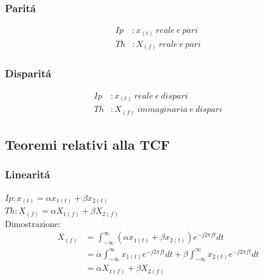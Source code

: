         \subsubsection{Paritá}\label{Parita}
            \begin{align}
                Ip&: x_{(t)}\ reale\ e\ pari  \nonumber \\
                Th&: X_{(f)}\ reale\ e\ pari \nonumber  
            \end{align}

        \subsubsection{Disparitá}\label{Disparita}
            \begin{align}
                Ip&: x_{(t)}\ reale\ e\ dispari  \nonumber \\
                Th&: X_{(f)}\ immaginaria\ e\ dispari \nonumber 
            \end{align}

    \subsection{Teoremi relativi alla TCF}
        \subsubsection{Linearitá}\label{Linearita}
            $Ip: x_{(t)} = \alpha x_{1(t)} + \beta x_{2(t)}$\\        
            $Th: X_{(f)} = \alpha X_{1(f)} + \beta X_{2(f)}$\\ 
            Dimostrazione:
            \begin{align}
                X_{(f)} & = \int_{-\infty}^{\infty} (\alpha x_{1(t)} + \beta x_{2(t)}) e^{-j2\pi ft} dt \nonumber \\
                        & = \alpha \int_{-\infty}^{\infty} x_{1(t)} e^{-j2\pi ft} dt + \beta \int_{-\infty}^{\infty}  x_{2(t)} e^{-j2\pi ft} dt  \nonumber \\
                        & = \alpha X_{1(f)} + \beta X_{2(f)} \nonumber
            \end{align}

